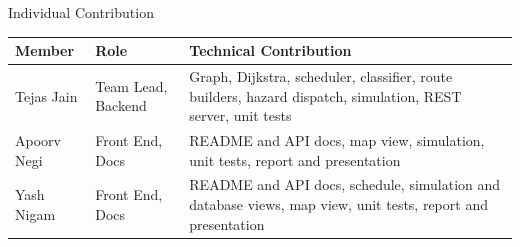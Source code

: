 \documentclass[aspectratio=169,11pt]{beamer}
\begin{document}
\begin{frame}{Individual Contribution}

\scriptsize

\begin{center}

\renewcommand{\arraystretch}{1.35}

\begin{tabularx}{.96\textwidth}
{@{}p{2.0cm}>{\raggedright\arraybackslash}p{2.4cm}X@{}}

\toprule
Member &
Role &
Technical Contribution\\
\midrule

Tejas Jain &
Team Lead, Backend &
Graph, Dijkstra, scheduler, classifier, route builders, hazard dispatch, simulation, REST server, unit tests\\

Apoorv Negi &
Front End, Docs &
README and API docs, map view, simulation, unit tests, report and presentation\\

Yash Nigam &
Front End, Docs &
README and API docs, schedule, simulation and database views, map view, unit tests, report and presentation\\

\bottomrule

\end{tabularx}

\end{center}

\end{frame}
\end{document}
